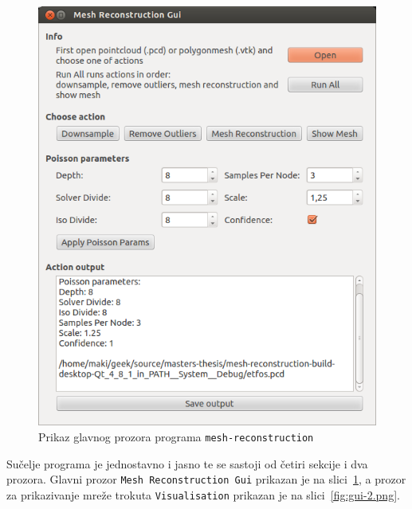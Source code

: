\begin{figure}[h]
\centering
\includegraphics[scale=0.5]{figures/mesh-reconstruction-gui.png}
\caption{Prikaz glavnog prozora programa \texttt{mesh-reconstruction} }
\label{fig:mesh-gui}
\end{figure}

Sučelje programa je jednostavno i jasno te se sastoji od četiri sekcije
i dva prozora. Glavni prozor \texttt{Mesh Reconstruction Gui} prikazan
je na slici~\ref{fig:mesh-gui}, a prozor za prikazivanje mreže trokuta
\texttt{Visualisation} prikazan je na slici~\ref{fig:gui-2.png}. \\

